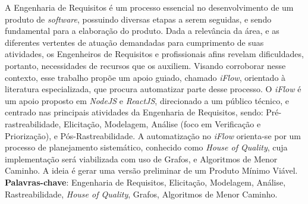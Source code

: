 \begin{resumo}
    A Engenharia de Requisitos é um processo essencial no desenvolvimento de um produto de \textit{software}, possuindo diversas etapas a serem seguidas, e sendo fundamental para a elaboração do produto. Dada a relevância da área, e as diferentes vertentes de atuação demandadas para cumprimento de suas atividades, os Engenheiros de Requisitos e profissionais afins revelam dificuldades, portanto, necessidades de recursos que os auxiliem. Visando corroborar nesse contexto, esse trabalho propõe um apoio guiado, chamado \textit{iFlow}, orientado à literatura especializada, que procura automatizar parte desse processo. O \textit{iFlow} é um apoio proposto em \textit{NodeJS} e \textit{ReactJS}, direcionado a um público técnico, e centrado nas principais atividades da Engenharia de Requisitos, sendo: Pré-rastreabilidade, Elicitação, Modelagem, Análise (foco em Verificação e Priorização), e Pós-Rastreabilidade. A automatização no \textit{iFlow} orienta-se por um processo de planejamento sistemático, conhecido como \textit{House of Quality}, cuja implementação será viabilizada com uso de Grafos, e Algoritmos de Menor Caminho. A ideia é gerar uma versão preliminar de um Produto Mínimo Viável.
    \vspace{\onelineskip}
    \noindent
    \\
    \textbf{Palavras-chave}: Engenharia de Requisitos, Elicitação, Modelagem, Análise, Rastreabilidade, \textit{House of Quality}, Grafos, Algoritmos de Menor Caminho.
\end{resumo}
